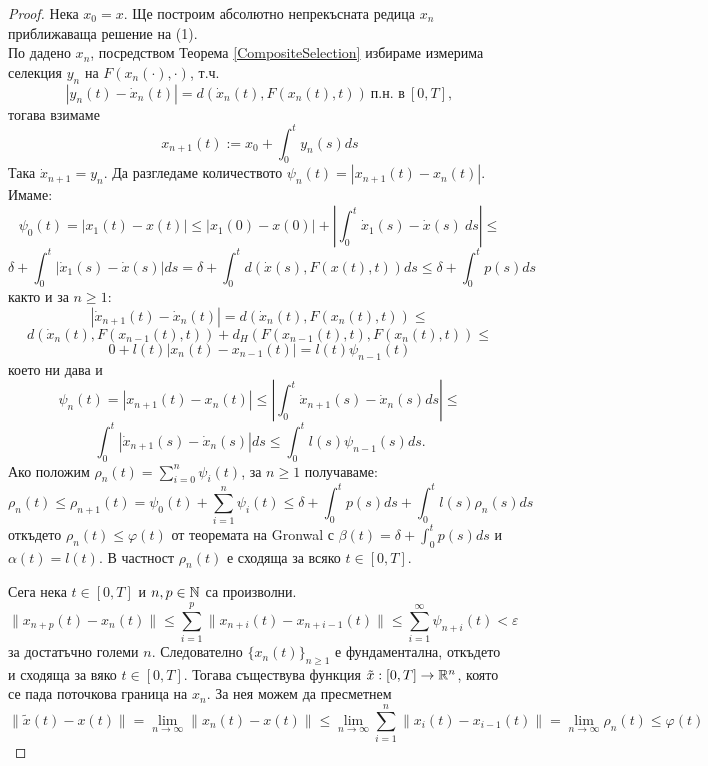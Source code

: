 \begin{proof}
    Нека $x_0 = x$. Ще построим абсолютно непрекъсната редица $x_n$ приближаваща решение на (1).\\
    По дадено $x_n$, посредством Теорема \ref{CompositeSelection} избираме измерима селекция $y_n$ на $F(x_n(\cdot), \cdot)$, т.ч.
    \[
        |y_n(t) - \dot{x}_n(t)| = d(\dot{x}_n(t), F(x_n(t), t))\ \text{п.н. в}\ [0,T],
    \]
    тогава взимаме
    \[
        x_{n+1}(t) := x_0 + \int_0^t y_n(s) ds
    \]
    Така $\dot{x}_{n+1} = y_n$. Да разгледаме количеството $\psi_n(t) = |x_{n+1}(t)-x_n(t)|$. Имаме:
    \[
        \psi_0(t) = |x_1(t) - x(t)| \leq
        |x_1(0) - x(0)| + |\int_0^t \dot{x}_1(s) - \dot{x}(s)\ ds| \leq
    \]
    \[
        \delta + \int_0^t |\dot{x}_1(s) - \dot{x}(s)| ds =
        \delta + \int_0^t d(\dot{x}(s), F(x(t), t)) ds \leq
        \delta + \int_0^t p(s) ds
    \]
    както и за $n\geq 1$:
    \[
        |\dot{x}_{n+1}(t) - \dot{x}_n(t)| = d(\dot{x}_n(t), F(x_n(t), t)) \leq
    \]
    \[
        d(\dot{x}_n(t), F(x_{n-1}(t), t)) + d_H(F(x_{n-1}(t), t), F(x_{n}(t), t)) \leq
    \]
    \[
        0 + l(t)|x_n(t) - x_{n-1}(t)| = l(t) \psi_{n-1}(t)
    \]
    което ни дава и
    \[
        \psi_n(t) = |x_{n+1}(t) - x_n(t)| \leq
        |\int_0^t \dot{x}_{n+1}(s) - \dot{x}_n(s) ds| \leq
    \]
    \[
        \int_0^t |\dot{x}_{n+1}(s) - \dot{x}_n(s)| ds \leq
        \int_0^t l(s) \psi_{n-1}(s) ds.
    \]
    Ако положим $\rho_n(t) = \sum_{i=0}^n \psi_i(t)$, за $n\geq 1$ получаваме:
    \[
        \rho_n(t)\leq \rho_{n+1}(t) = \psi_0(t) + \sum_{i=1}^n \psi_i(t) \leq
        \delta + \int_0^t p(s)ds + \int_0^t l(s) \rho_n(s)ds
    \]
    откъдето $\rho_n(t)\leq\varphi(t)$ от теоремата на Gronwal с $\beta(t) = \delta + \int_0^t p(s) ds$ и $\alpha(t) = l(t)$.
    В частност $\rho_n(t)$ е сходяща за всяко $t\in [0, T]$.

    Сега нека $t\in [0,T]$ и $n,p\in\mathbb{N}$ са произволни.
    \[
        \lVert x_{n+p}(t) - x_n(t)\rVert \leq
        \sum_{i=1}^p \lVert x_{n+i}(t) - x_{n+i-1}(t)\rVert \leq
        \sum_{i=1}^\infty \psi_{n+i}(t) < \varepsilon
    \]
    за достатъчно големи $n$. Следователно $\{x_n(t)\}_{n\geq 1}$ е фундаментална, откъдето и сходяща за вяко $t\in [0,T]$. Тогава съществува функция $\tilde{x}:[0,T]\to\mathbb{R}^n$, която се пада поточкова граница на $x_n$. За нея можем да пресметнем
    \small
    \[
        \lVert \tilde{x}(t) - x(t)\rVert =
        \lim_{n\to\infty} \lVert x_n(t) - x(t)\rVert \leq
        \lim_{n\to\infty} \sum_{i=1}^n \lVert x_i(t) - x_{i-1}(t)\rVert =
        \lim_{n\to\infty} \rho_n(t) \leq
        \varphi(t)
    \]


\end{proof}
